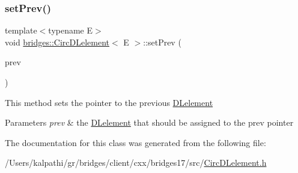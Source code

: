 \subsubsection{\texorpdfstring{set\+Prev()}{setPrev()}}
{\footnotesize\ttfamily template$<$typename E$>$ \\
void \mbox{\hyperlink{classbridges_1_1_circ_d_lelement}{bridges\+::\+Circ\+D\+Lelement}}$<$ E $>$\+::set\+Prev (\begin{DoxyParamCaption}\item[{\mbox{\hyperlink{classbridges_1_1_circ_d_lelement}{Circ\+D\+Lelement}}$<$ E $>$ $\ast$}]{prev }\end{DoxyParamCaption})\hspace{0.3cm}{\ttfamily [inline]}}

This method sets the pointer to the previous \mbox{\hyperlink{classbridges_1_1_d_lelement}{D\+Lelement}} 
\begin{DoxyParams}{Parameters}
{\em prev} & the \mbox{\hyperlink{classbridges_1_1_d_lelement}{D\+Lelement}} that should be assigned to the prev pointer \\
\hline
\end{DoxyParams}


The documentation for this class was generated from the following file\+:\begin{DoxyCompactItemize}
\item 
/\+Users/kalpathi/gr/bridges/client/cxx/bridges17/src/\mbox{\hyperlink{_circ_d_lelement_8h}{Circ\+D\+Lelement.\+h}}\end{DoxyCompactItemize}
